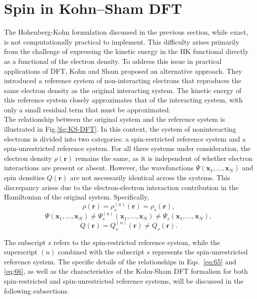 \documentclass[%
 preprint, linenumbers,
 amsmath,amssymb,
 aps, physrev,
]{revtex4-2}
\begin{document}
\section{Spin in Kohn–Sham DFT}

The Hohenberg-Kohn formulation discussed in the previous section, while exact, is not computationally practical to implement. This difficulty arises primarily from the challenge of expressing the kinetic energy in the HK functional directly as a functional of the electron density. To address this issue in practical applications of DFT, Kohn and Sham proposed an alternative approach. They introduced a reference system of non-interacting electrons that reproduces the same electron density as the original interacting system. The kinetic energy of this reference system closely approximates that of the interacting system, with only a small residual term that must be approximated.\\

The relationship between the original system and the reference system is illustrated in Fig.\ref{fig:KS-DFT}. In this context, the system of noninteracting electrons is divided into two categories: a spin-restricted reference system and a spin-unrestricted reference system. For all three systems under consideration, the electron density $\rho(\mathbf{r})$ remains the same, as it is independent of whether electron interactions are present or absent. However, the wavefunctions $\Psi(\mathbf{x}_1,...,\mathbf{x}_N)$ and spin densities $Q(\mathbf{r})$  are not necessarily identical across the systems. This discrepancy arises due to the electron-electron interaction contribution in the Hamiltonian of the original system. Specifically,
\begin{equation}
    \rho(\mathbf{r}) =\rho_s^{(u)}(\mathbf{r})=\rho_s(\mathbf{r}),
\end{equation}
\begin{equation}
    \Psi(\mathbf{x}_1,...,\mathbf{x}_N) \neq \Psi_s^{(u)}(\mathbf{x}_1,...,\mathbf{x}_N) \neq \Psi_s(\mathbf{x}_1,...,\mathbf{x}_N),
    \label{eq:65}
\end{equation}
\begin{equation}
    Q(\mathbf{r}) = Q_s^{(u)}(\mathbf{r}) \neq Q_s(\mathbf{r}).
    \label{eq:66}
\end{equation}

The subscript $s$ refers to the spin-restricted reference system, while the superscript $(u)$ combined with the subscript $s$ represents the spin-unrestricted reference system. The specific details of the relationships in Eqs.~\eqref{eq:65} and \eqref{eq:66}, as well as the characteristics of the Kohn-Sham DFT formalism for both spin-restricted and spin-unrestricted reference systems, will be discussed in the following subsections.\\
\end{document}

